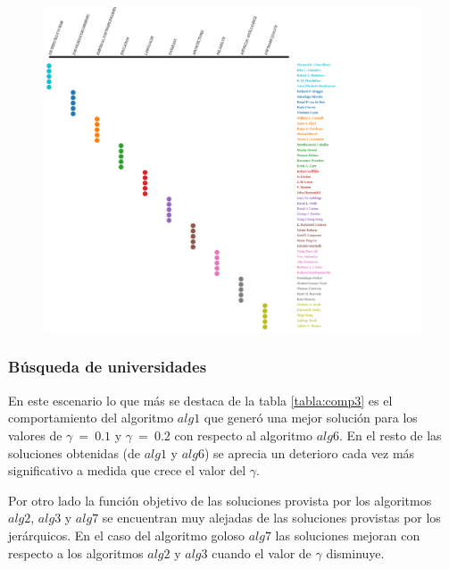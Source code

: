 \begin{figure}[H]
  \centering
    \includegraphics[width=1\textwidth]{img/aut-alg-6.png}
  \caption{}
  \label{res:aut-alg-6}
\end{figure}



\subsubsection{Búsqueda de universidades}
En este escenario lo que más se destaca de la tabla \ref{tabla:comp3} es el comportamiento del algoritmo $alg1$ que generó una mejor solución para los valores de $\gamma\ =\ 0.1$ y $\gamma\ =\ 0.2$ con respecto al algoritmo $alg6$. En el resto de las soluciones obtenidas (de $alg1$ y $alg6$) se aprecia un deterioro cada vez más significativo a medida que crece el valor del $\gamma$.

Por otro lado la función objetivo de las soluciones provista por los algoritmos $alg2$, $alg3$ y $alg7$ se encuentran muy alejadas de las soluciones provistas por los jerárquicos. En el caso del algoritmo goloso $alg7$ las soluciones mejoran con respecto a los algoritmos $alg2$ y $alg3$ cuando el valor de $\gamma$ disminuye.

